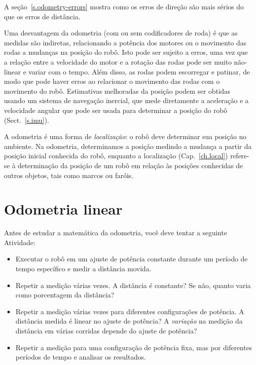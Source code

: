 {A seção~\ref{s.odometry-errors} mostra como os erros de direção são mais sérios do que os erros de distância.

Uma desvantagem da odometria (com ou sem codificadores de roda) é que as medidas são indiretas, relacionando a potência dos motores ou o movimento das rodas a mudanças na posição do robô. Isto pode ser sujeito a erros, uma vez que a relação entre a velocidade do motor e a rotação das rodas pode ser muito não-linear e variar com o tempo. Além disso, as rodas podem escorregar e patinar, de modo que pode haver erros ao relacionar o movimento das rodas com o movimento do robô. Estimativas melhoradas da posição podem ser obtidas usando um sistema de navegação inercial, que mede diretamente a aceleração e a velocidade angular que pode ser usada para determinar a posição do robô (Sect.~\ref{s.imu}).

A odometria é uma forma de \emph{localização}: o robô deve determinar sua posição no ambiente. Na odometria, determinamos a posição medindo a mudança a partir da posição inicial conhecida do robô, enquanto a localização (Cap.~\ref{ch.local}) refere-se à determinação da posição de um robô em relação às posições conhecidas de outros objetos, tais como marcos ou faróis.

\section{Odometria linear}

Antes de estudar a matemática da odometria, você deve tentar a seguinte Atividade:

\begin{framed}
\begin{itemize}
\item Executar o robô em um ajuste de potência constante durante um período de tempo específico e medir a distância movida.
\item Repetir a medição várias vezes. A distância é constante? Se não, quanto varia como porcentagem da distância?
\item Repetir a medição várias vezes para diferentes configurações de potência. A distância medida é linear no ajuste de potência? A \emph{variação} na medição da distância em várias corridas depende do ajuste de potência?
\item Repetir a medição para uma configuração de potência fixa, mas por diferentes períodos de tempo e analisar os resultados.
\end{itemize}
\end{framed}

}
